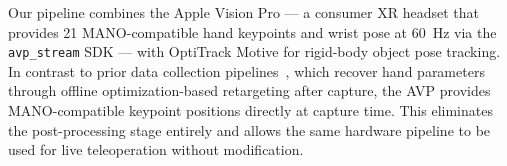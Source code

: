 Our pipeline combines the Apple Vision Pro --- a consumer XR headset that provides
21 MANO-compatible hand keypoints and wrist pose at \SI{60}{\hertz} via the
\texttt{avp\_stream} SDK --- with OptiTrack Motive for rigid-body object pose tracking.
In contrast to prior data collection pipelines~\cite{dexcap, oakinkv2, maniptrans,
dexmachina}, which recover hand parameters through offline optimization-based retargeting
after capture, the AVP provides MANO-compatible keypoint positions directly at capture
time. This eliminates the post-processing stage entirely and allows the same hardware pipeline
to be used for live teleoperation without modification.
